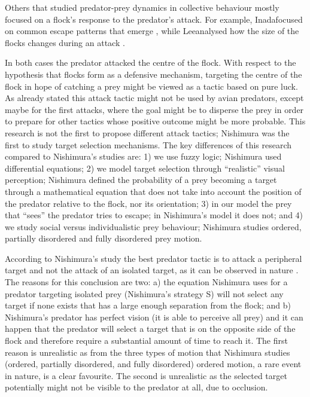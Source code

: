 Others that studied predator-prey dynamics in collective behaviour mostly focused on a flock's response to the predator's attack. For example, Inada\etal focused on common escape patterns that emerge \cite{inada2002order}, while Lee\etal analysed how the size of the flocks changes during an attack \cite{lee2006dynamics}.

In both cases the predator attacked the centre of the flock. With respect to the hypothesis that flocks form as a defensive mechanism, targeting the centre of the flock in hope of catching a prey might be viewed as a tactic based on pure luck. As already stated this attack tactic might not be used by avian predators, except maybe for the first attacks, where the goal might be to disperse the prey in order to prepare for other tactics whose positive outcome might be more probable. This research is not the first to propose different attack tactics; Nishimura \cite{nishimura2000studying,nishimura2002predator} was the first to study target selection mechanisms. The key differences of this research compared to Nishimura's studies are: 1) we use fuzzy logic; Nishimura used differential equations; 2) we model target selection through ``realistic'' visual perception; Nishimura defined the probability of a prey becoming a target through a mathematical equation that does not take into account the position of the predator relative to the flock, nor its orientation; 3) in our model the prey that ``sees'' the predator tries to escape; in Nishimura's model it does not; and 4) we study social versus individualistic prey behaviour; Nishimura studies ordered, partially disordered and fully disordered prey motion.

According to Nishimura's study \cite{nishimura2002predator} the best predator tactic is to attack a peripheral target and not the attack of an isolated target, as it can be observed in nature \cite{stephens2003modelling,ioannou2012predatory}. The reasons for this conclusion are two: a) the equation Nishimura uses for a predator targeting isolated prey (Nishimura's strategy S) will not select any target if none exists that has a large enough separation from the flock; and b) Nishimura's predator has perfect vision (\ie it is able to perceive all prey) and it can happen that the predator will select a target that is on the opposite side of the flock and therefore require a substantial amount of time to reach it. The first reason is unrealistic as from the three types of motion that Nishimura studies (\ie ordered, partially disordered, and fully disordered) ordered motion, a rare event in nature, is a clear favourite. The second is unrealistic as the selected target potentially might not be visible to the predator at all, due to occlusion.

